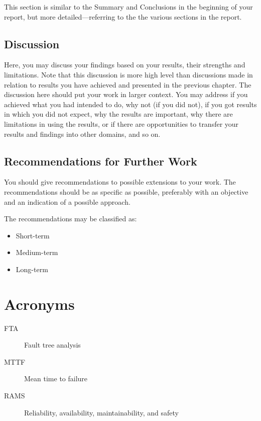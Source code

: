 \documentclass[12pt]{report}
\begin{document}
This section is similar to the Summary and Conclusions in the beginning of your report, but more detailed---referring to the the various sections in the report.

\section{Discussion}
Here, you may discuss your findings based on your results, their strengths and limitations. Note that this discussion is more high level than discussions made in relation to results you have achieved and presented in the previous chapter. The discussion here should put your work in larger context. You may address if you achieved what you had intended to do, why not (if you did not), if you got results in which you did not expect, why the results are important, why there are limitations in using the results, or if there are opportunities to transfer your results and findings into other domains, and so on.
\section{Recommendations for Further Work}
You should give recommendations to possible extensions to your work. The recommendations should be as specific as possible, preferably with an objective and an indication of a possible approach.

The recommendations may be classified as:
\begin{itemize}
\item Short-term
\item Medium-term
\item Long-term
\end{itemize}

  
\appendix

\chapter{Acronyms}
\begin{description}
\item[FTA] Fault tree analysis
\item[MTTF] Mean time to failure
\item[RAMS] Reliability, availability, maintainability, and safety
\end{description}
\end{document}
